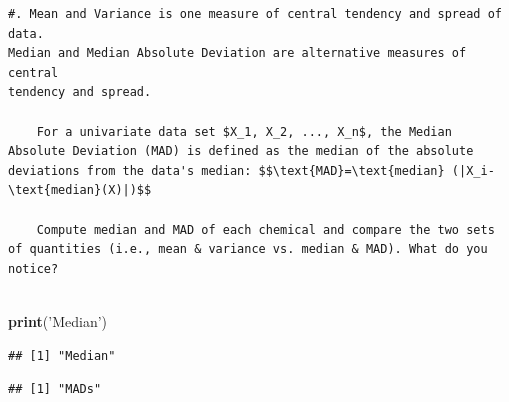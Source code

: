 \documentclass[]{article}
\newenvironment{Shaded}{\begin{snugshade}}{\end{snugshade}}
\newcommand{\KeywordTok}[1]{\textcolor[rgb]{0.13,0.29,0.53}{\textbf{#1}}}
\newcommand{\DataTypeTok}[1]{\textcolor[rgb]{0.13,0.29,0.53}{#1}}
\newcommand{\StringTok}[1]{\textcolor[rgb]{0.31,0.60,0.02}{#1}}
\newcommand{\OtherTok}[1]{\textcolor[rgb]{0.56,0.35,0.01}{#1}}
\newcommand{\ControlFlowTok}[1]{\textcolor[rgb]{0.13,0.29,0.53}{\textbf{#1}}}
\newcommand{\OperatorTok}[1]{\textcolor[rgb]{0.81,0.36,0.00}{\textbf{#1}}}
\newcommand{\NormalTok}[1]{#1}
\begin{document}
\begin{verbatim}
#. Mean and Variance is one measure of central tendency and spread of data.
Median and Median Absolute Deviation are alternative measures of central
tendency and spread. 

    For a univariate data set $X_1, X_2, ..., X_n$, the Median Absolute Deviation (MAD) is defined as the median of the absolute deviations from the data's median: $$\text{MAD}=\text{median} (|X_i-\text{median}(X)|)$$

    Compute median and MAD of each chemical and compare the two sets of quantities (i.e., mean & variance vs. median & MAD). What do you notice? 
    
\end{verbatim}

\begin{Shaded}
\begin{Highlighting}[]
\KeywordTok{print}\NormalTok{(}\StringTok{'Median'}\NormalTok{)}
\end{Highlighting}
\end{Shaded}

\begin{verbatim}
## [1] "Median"
\end{verbatim}

\begin{Shaded}
\end{Shaded}

\begin{verbatim}
## [1] "MADs"
\end{verbatim}
\end{document}
